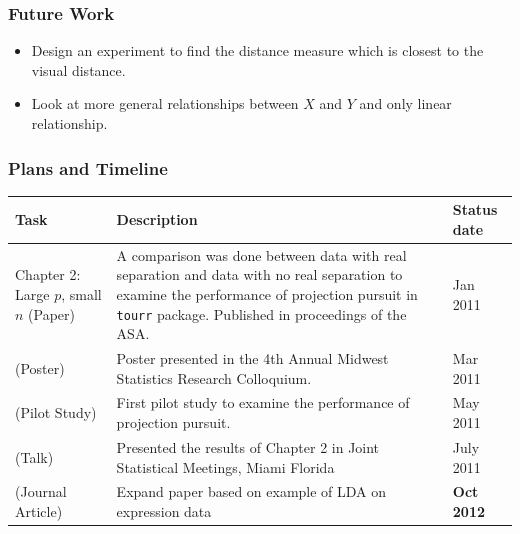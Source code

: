 \documentclass{beamer}
\begin{document}
\begin{frame}
\frametitle{Future Work}
\begin{itemize}
\item Design an experiment to find the distance measure which is closest to the visual distance.
\item Look at more general relationships between $X$ and $Y$ and only linear relationship.
\end{itemize}
\end{frame}


\begin{frame}
\frametitle{Plans and Timeline}
\begin{table}[hbtp]
\small
\centering 
\begin{tabular}{|p{3cm}|p{6cm}|l|} 
\hline
Task &  Description & Status date\\ %
\hline
Chapter 2: Large $p$, small $n$ (Paper)  & A comparison was done between data with real separation and data with no real separation to examine the performance of projection pursuit in \texttt{tourr} package. Published in proceedings of the ASA. & Jan 2011 \\
(Poster) & Poster presented in the 4th Annual Midwest Statistics Research Colloquium. & Mar 2011 \\
(Pilot Study) & First pilot study to examine the performance of projection pursuit.   & May 2011\\ 
(Talk) & Presented the results of Chapter 2 in Joint Statistical Meetings, Miami Florida  & July 2011 \\
(Journal Article) & Expand paper based on example of LDA on expression data  & {\bf Oct 2012} \\\hline
\end{tabular}
\label{tbl:tjob}
\end{table}	
\end{frame}
\end{document}
